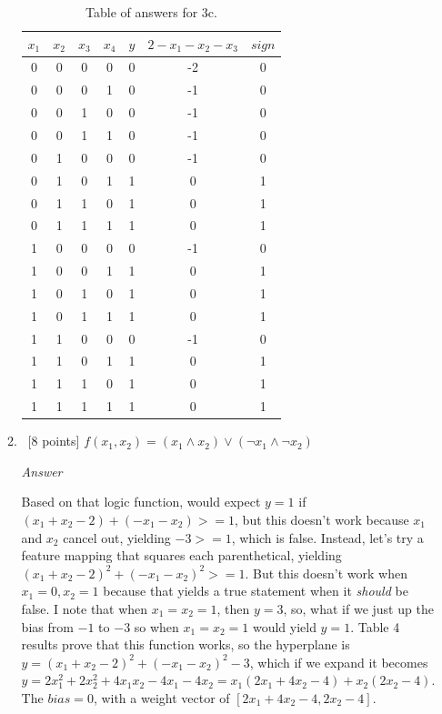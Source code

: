 \documentclass[12pt, fullpage,letterpaper]{article}
\begin{document}
\begin{enumerate}
\begin{enumerate}
		\begin{table}
        	\centering
        	\begin{tabular}{cccccc|c}
        		$x_1 $ & $x_2$ & $x_3$ & $x_4$ & $y$ & $2-x_1-x_2-x_3$ & $sign$\\ 
        		\hline\hline
        		0 & 0 & 0 & 0 & 0 & -2 & 0 \\ \hline
        		0 & 0 & 0 & 1 & 0 & -1 & 0 \\ \hline
        		0 & 0 & 1 & 0 & 0 & -1 & 0 \\ \hline
        		0 & 0 & 1 & 1 & 0 & -1 & 0 \\ \hline
        		0 & 1 & 0 & 0 & 0 & -1 & 0 \\ \hline
        		0 & 1 & 0 & 1 & 1 &  0 & 1 \\ \hline
        		0 & 1 & 1 & 0 & 1 &  0 & 1 \\ \hline
        		0 & 1 & 1 & 1 & 1 &  0 & 1 \\ \hline
        		1 & 0 & 0 & 0 & 0 & -1 & 0 \\ \hline
        		1 & 0 & 0 & 1 & 1 &  0 & 1 \\ \hline
        		1 & 0 & 1 & 0 & 1 &  0 & 1 \\ \hline
        		1 & 0 & 1 & 1 & 1 &  0 & 1 \\ \hline
        		1 & 1 & 0 & 0 & 0 & -1 & 0 \\ \hline
        		1 & 1 & 0 & 1 & 1 &  0 & 1 \\ \hline
        		1 & 1 & 1 & 0 & 1 &  0 & 1 \\ \hline
        		1 & 1 & 1 & 1 & 1 &  0 & 1 \\ \hline
        	\end{tabular}
        	\caption{Table of answers for 3c.}\label{tb:1}
        \end{table}
        
		\item ~[8 points] $f(x_1, x_2) = (x_1 \land x_2) \lor (\neg x_1 \land \neg x_2)$
		
		\emph{Answer}
		
		Based on that logic function, would expect $y=1$ if $(x_1+x_2-2)+(-x_1-x_2)>=1$, but this doesn't work because $x_1$ and $x_2$ cancel out, yielding $-3>=1$, which is false. Instead, let's try a feature mapping that squares each parenthetical, yielding $(x_1+x_2-2)^2+(-x_1-x_2)^2>=1$. But this doesn't work when $x_1=0, x_2=1$ because that yields a true statement when it \emph{should} be false. I note that when $x_1=x_2=1$, then $y=3$, so, what if we just up the bias from $-1$ to $-3$ so when $x_1=x_2=1$ would yield $y=1$. Table 4 results prove that this function works, so the hyperplane is $y=(x_1+x_2-2)^2+(-x_1-x_2)^2-3$, which if we expand it becomes $y=2x_1^2+2x_2^2+4x_1x_2-4x_1-4x_2=x_1(2x_1+4x_2-4)+x_2(2x_2-4)$. The $bias=0$, with a weight vector of $[2x_1+4x_2-4, 2x_2-4]$.
		

\end{enumerate}
\end{enumerate}
\end{document}
